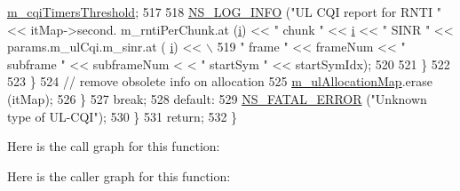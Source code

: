 \begin{DoxyCode}
      \hyperlink{classns3_1_1MmWaveFlexTtiMaxWeightMacScheduler_a12853e0079042ba54793594532d1ef15}{m\_cqiTimersThreshold};
517 
518                                         \hyperlink{group__logging_gafbd73ee2cf9f26b319f49086d8e860fb}{NS\_LOG\_INFO} (\textcolor{stringliteral}{"UL CQI report for RNTI "} << itMap->second.
      m\_rntiPerChunk.at (\hyperlink{bernuolliDistribution_8m_a6f6ccfcf58b31cb6412107d9d5281426}{i}) << \textcolor{stringliteral}{" chunk "} << \hyperlink{bernuolliDistribution_8m_a6f6ccfcf58b31cb6412107d9d5281426}{i} << \textcolor{stringliteral}{" SINR "} << params.m\_ulCqi.m\_sinr.at (
      \hyperlink{bernuolliDistribution_8m_a6f6ccfcf58b31cb6412107d9d5281426}{i}) << \(\backslash\)
519                                                      \textcolor{stringliteral}{" frame "} << frameNum << \textcolor{stringliteral}{" subframe "} << subframeNum <
      < \textcolor{stringliteral}{" startSym "} << startSymIdx);
520 
521                                 \}
522 
523                         \}
524                         \textcolor{comment}{// remove obsolete info on allocation}
525                         \hyperlink{classns3_1_1MmWaveFlexTtiMaxWeightMacScheduler_ac8ae3992d5f26804eff2d4cab3309777}{m\_ulAllocationMap}.erase (itMap);
526                 \}
527                 \textcolor{keywordflow}{break};
528                 \textcolor{keywordflow}{default}:
529                         \hyperlink{group__fatal_ga5131d5e3f75d7d4cbfd706ac456fdc85}{NS\_FATAL\_ERROR} (\textcolor{stringliteral}{"Unknown type of UL-CQI"});
530         \}
531         \textcolor{keywordflow}{return};
532 \}
\end{DoxyCode}


Here is the call graph for this function\+:




Here is the caller graph for this function\+:


